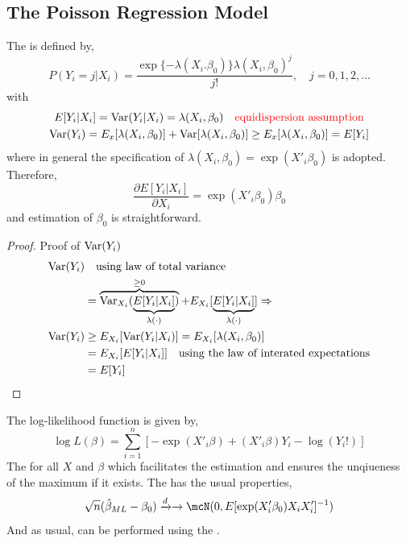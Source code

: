 \subsection{The Poisson Regression Model}
The  is defined by,
\begin{equation}
    P(Y_i = j|X_i) = \frac{\exp\{-\lambda(X_i.\beta_0)\}\lambda(X_i,\beta_0)^j}{j!},\quad j=0,1,2,\ldots
\end{equation}
with
\begin{gather*}
    E[Y_i|X_i] = \operatorname{Var}(Y_i|X_i) = \lambda(X_i,\beta_0)\quad \textcolor{red}{\text{equidispersion assumption}}\\
    \operatorname{Var}(Y_i) = E_x[\lambda(X_i,\beta_0)] + \operatorname{Var}[\lambda(X_i,\beta_0)]\geq E_x[\lambda(X_i,\beta_0)] = E[Y_i]
\end{gather*}
where in general the specification of $\lambda(X_i,\beta_0) = \exp(X'_i\beta_0)$ is adopted. 
Therefore, 
\begin{equation*}
    \frac{\partial E[Y_i|X_i]}{\partial X_i} = \exp(X'_i\beta_0)\beta_0
\end{equation*}
and  estimation of $\beta_0$ is straightforward.
\begin{proof}
    Proof of $\operatorname{Var}(Y_i)$
    \begin{align*}
        \operatorname{Var}(Y_i) & \quad\text{using law of total variance}\\
        & = \overbrace{\operatorname{Var}_{X_i}(\underbrace{E[Y_i|X_i]}_{\lambda(\cdot)})}^{\geq 0}
        + E_{X_i}[\underbrace{E[Y_i|X_i]}_{\lambda(\cdot)}]\Rightarrow\\
        \operatorname{Var}(Y_i) & \geq E_{X_i}[\operatorname{Var}(Y_i|X_i)] = E_{X_i}[\lambda(X_i,\beta_0)]\\
        & = E_{X_i}[E[Y_i|X_i]]\quad\text{using the law of interated expectations}\\
        & = E[Y_i]
    \end{align*}
\end{proof}
The log-likelihood function is given by,
\begin{equation*}
    \log L(\beta) = \sum_{i=1}^{n}[-\exp(X'_i\beta)+(X'_i\beta)Y_i-\log(Y_i!)]
\end{equation*}
The  for all $X$ and $\beta$ which facilitates the estimation and ensures the unqiueness of the maximum if it exists.
The  has the usual properties,
\begin{equation*}
    \sqrt{n}(\hat{\beta}_{ML}-\beta_0)\xrightarrow{d}\to\mcN(0, E[\exp(X'_i\beta_0)X_i X'_i]^{-1})
\end{equation*}
And as usual,  can be performed using the .

